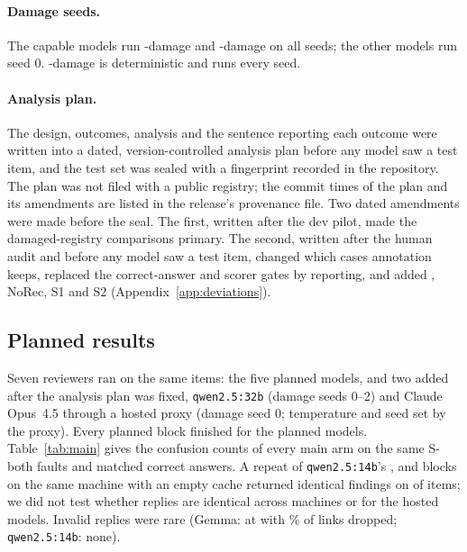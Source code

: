 \paragraph{Damage seeds.}
The capable models run -damage and -damage on all \NDamageSeedsCapable{} seeds; the other models run
seed 0. -damage is deterministic and runs every seed.

\paragraph{Analysis plan.}
The design, outcomes, analysis and the sentence reporting each outcome were written into a dated, version-controlled
analysis plan before any model saw a test item, and the test set was sealed with a fingerprint recorded in the
repository. The plan was not filed with a public registry; the commit times of the plan and its amendments are listed in the release's provenance file. Two dated
amendments were made before the seal. The first, written after the dev pilot, made the
damaged-registry comparisons primary. The second, written after the human audit and before any model saw a test item,
changed which cases annotation keeps, replaced the correct-answer and scorer gates by reporting, and added ,
NoRec, S1 and S2 (Appendix~\ref{app:deviations}).

\subsection{Planned results}
\label{app:study1-results}

Seven reviewers ran on the same items: the five planned models, and two added after the analysis plan was fixed,
\texttt{qwen2.5:32b} (damage seeds 0--2) and Claude Opus~4.5 through a hosted proxy (damage seed 0; temperature and
seed set by the proxy). Every planned block finished for the planned models.
Table~\ref{tab:main} gives the confusion counts of every main arm on the same \NFaultsSBoth{} S-both faults and
\NControlsSBoth{} matched correct answers. A repeat of \texttt{qwen2.5:14b}'s ,  and 
blocks on the same machine with an empty cache returned identical findings on \NRepeatSameFindings{} of
\NRepeatItems{} items; we did not test whether replies are identical across machines or for the hosted models. Invalid replies were rare (Gemma: \InvalidKNGemmaRFourDropFifty{} at
 with \DamageDropFifty\% of links dropped; \texttt{qwen2.5:14b}: none).


